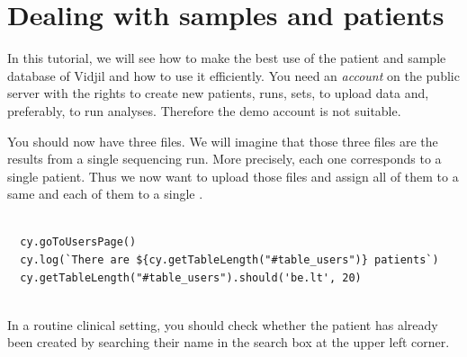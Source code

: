 \section{Dealing with samples and patients}

In this tutorial, we will see how to make 
the best use of the patient and sample database of Vidjil and
how to use it efficiently.
You need an \textit{account} on the public server with the rights to create new patients,
runs, sets, to upload data and, preferably, to run analyses.
Therefore the demo account is not suitable.




You should now have three files. We will imagine that those three files are
the results from a single sequencing run. More precisely, each one corresponds to
a single patient. Thus we now want to upload those files and assign all of
them to a same  and each of them to a single .

\begin{verbatim}

  cy.goToUsersPage()
  cy.log(`There are ${cy.getTableLength("#table_users")} patients`)
  cy.getTableLength("#table_users").should('be.lt', 20)


\end{verbatim}

In a routine clinical setting, you should check whether the patient has
already been created by searching their name in the search box at the
upper left corner.

